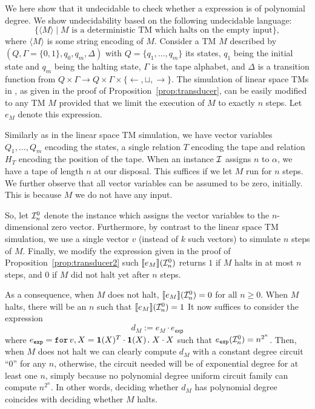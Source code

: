 We here show that it undecidable to check whether a \langfor expression is of polynomial degree.
We show undecidability based on the following undecidable language:
    $$
    \{ \langle M\rangle\mid \text{$M$ is a deterministic TM which halts on the empty input}\},
    $$
    where $\langle M\rangle$ is some string encoding of $M$.
    Consider a TM $M$ described by $(Q,\Gamma=\{0,1\},q_0,q_m,\Delta)$
    with $Q=\{q_1,\ldots,q_m\}$ its states, $q_1$ being the initial state and $q_m$ being
    the halting state, $\Gamma$ is the tape alphabet, and $\Delta$ is a transition function
    from $Q\times \Gamma\to Q\times\Gamma\times \{\leftarrow,\sqcup,\rightarrow\}$. The simulation
    of linear space TMs in \langfor, as given in the proof of Proposition~\ref{prop:transducer}, can be easily modified to
    any TM $M$ provided that we limit the execution of $M$ to exactly $n$ steps. Let $e_M$ denote this expression. 
	
	Similarly
    as in the linear space TM simulation, we have vector variables $Q_1,\ldots,Q_m$ encoding the
    states, a single relation $T$ encoding the tape and relation $H_T$ encoding the position
    of the tape.  When an instance $\mathcal{I}$ assigns $n$ to $\alpha$, we have a tape of length $n$ at our disposal. This suffices if we let $M$ run for $n$ steps. We further observe that all vector variables can be assumed to be zero, initially.
    This is because $M$ we do not have any input. 
	
	So, let $\mathcal{I}_n^0$ denote the instance which assigns the vector variables to the $n$-dimensional zero vector.  Furthermore, by contrast to the linear space TM simulation, we use a single vector $v$ (instead of $k$ such vectors) to simulate $n$ steps of $M$. Finally, we modify the expression given in the proof of Proposition~\ref{prop:transducer2} such $\llbracket e_M \rrbracket(\mathcal{I}_n^0)$  returns $1$ if $M$
    halts in at most $n$ steps, and $0$ if $M$ did not halt yet after $n$ steps.

    As a consequence, when $M$ does not halt, $\llbracket e_M \rrbracket(\mathcal{I}_n^0)=0$ for all $n\geq 0$. When $M$ halts, there will be an $n$ such that $\llbracket e_M \rrbracket(\mathcal{I}_n^0)=1$ It now suffices to consider the \langfor expression
    $$
    d_M:=e_M\cdot e_{\mathsf{exp}}
    $$
    where $e_{\texttt{exp}} = \texttt{for}\, v,X=\mathbf{1}(X)^T\cdot\mathbf{1}(X) \texttt{.}\, X\cdot X$ such that
    $e_{\texttt{exp}}(\mathcal{I}_n^0)=n^{2^n}$. Then, when $M$ does not halt we can clearly compute $d_M$ with a constant degree circuit ``0''
    for any $n$, otherwise, the circuit needed will be of exponential degree
    for at least one $n$, simply because no polynomial degree uniform  circuit family can compute $n^{2^n}$. In other words, deciding whether $d_M$ has polynomial degree coincides with deciding whether $M$ halts.
